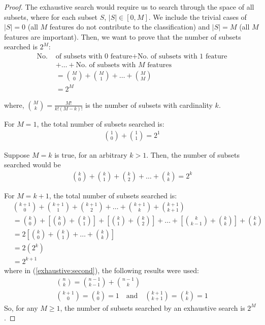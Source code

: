 \documentclass[12pt, twoside, a4paper]{report}
\begin{document}
\begin{proof}
The exhaustive search would require us to search through the space of all subsets, where for each subset $S$, $|S| \in \left[ 0, M \right]$. We include the trivial cases of $|S|=0$ (all $M$ features do not contribute to the classification) and $|S|=M$ (all $M$ features are important). Then, we want to prove that the number of subsets searched is $2^M$:
\begin{align*}
\text{No. } &\text{of subsets with 0 feature} + \text{No. of subsets with 1 feature} \\ & + \dots + \text{No. of subsets with $M$ features} \\
&= {{M}\choose{0}} + {{M}\choose{1}} + \dots + {{M}\choose{M}} \\
&= 2^M
\end{align*}

where, ${{M}\choose{k}} = \frac{M!}{k!(M-k)!}$ is the number of subsets with cardinality $k$. 

For $M=1$, the total number of subsets searched is:
\begin{align*}
{{1}\choose{0}} + {{1}\choose{1}} = 2^1
\end{align*}

Suppose $M=k$ is true, for an arbitrary $k>1$. Then, the number of subsets searched would be
\begin{align*}
{{k}\choose{0}} + {{k}\choose{1}} + {{k}\choose{2}} + \dots + {{k}\choose{k}} = 2^k 
\end{align*}

For $M=k+1$, the total number of subsets searched is:
\begin{align}
&{{k+1}\choose{0}} + {{k+1}\choose{1}} + {{k+1}\choose{2}} + \dots + {{k+1}\choose{k}} + {{k+1}\choose{k+1}} \nonumber \\
&= {{k}\choose{0}} + \left[ {{k}\choose{0}} + {{k}\choose{1}} \right] + \left[ {{k}\choose{1}} + {{k}\choose{2}} \right] + \dots + \left[ {{k}\choose{k-1}} + {{k}\choose{k}} \right] + {{k}\choose{k}} \label{exhaustive:second} \\
&= 2 \left[ {{k}\choose{0}} + {{k}\choose{1}} + \dots + {{k}\choose{k}} \right] \nonumber \\
&= 2 \left(2^k \right) \nonumber \\
&= 2^{k+1} \nonumber
\end{align}
where in (\ref{exhaustive:second}), the following results were used:
\begin{gather*}
{{n}\choose{k}} = {{n-1}\choose{k-1}} + {{n-1}\choose{k}} \\[1em]
{{k+1}\choose{0}} = {{k}\choose{0}} = 1 \quad \text{and} \quad {{k+1}\choose{k+1}} = {{k}\choose{k}} = 1
\end{gather*}
So, for any $M\geq 1$, the number of subsets searched by an exhaustive search is $2^M$.
\end{proof}
\end{document}
